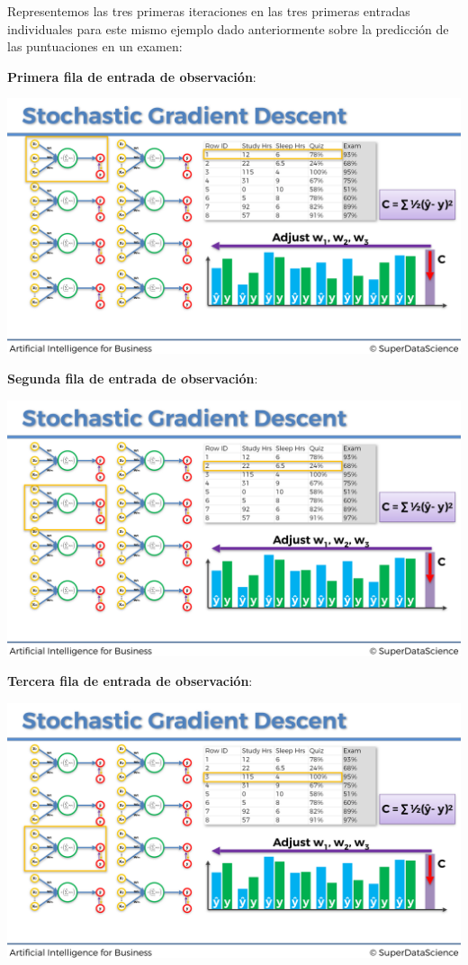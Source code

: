 \documentclass[
]{book}
\begin{document}
Representemos las tres primeras iteraciones en las tres primeras entradas individuales para este mismo ejemplo dado anteriormente sobre la predicción de las puntuaciones en un examen:

\textbf{Primera fila de entrada de observación}:

\includegraphics{Images/ANN_27.png}

\textbf{Segunda fila de entrada de observación}:

\includegraphics{Images/ANN_28.png}

\textbf{Tercera fila de entrada de observación}:

\includegraphics{Images/ANN_29.png}
\end{document}
